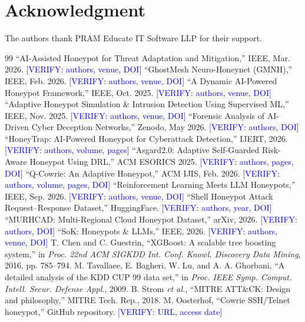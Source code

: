 \documentclass[conference]{IEEEtran}
\newcommand{\ver}[1]{\textcolor{blue}{[VERIFY: #1]}}
\begin{document}
\section*{Acknowledgment}
The authors thank PRAM Educate IT Software LLP for their support.

\begin{thebibliography}{99}
 ``AI-Assisted Honeypot for Threat Adaptation and Mitigation,'' IEEE, Mar. 2026. \ver{authors, venue, DOI}
 ``GhostMesh Neuro-Honeynet (GMNH),'' IEEE, Feb. 2026. \ver{authors, venue, DOI}
 ``A Dynamic AI-Powered Honeypot Framework,'' IEEE, Oct. 2025. \ver{authors, venue, DOI}
 ``Adaptive Honeypot Simulation \& Intrusion Detection Using Supervised ML,'' IEEE, Nov. 2025. \ver{authors, venue, DOI}
 ``Forensic Analysis of AI-Driven Cyber Deception Networks,'' Zenodo, May 2026. \ver{authors, DOI}
 ``HoneyTrap: AI-Powered Honeypot for Cyberattack Detection,'' IJERT, 2026. \ver{authors, volume, pages}
 ``Asgard2.0: Adaptive Self-Guarded Risk-Aware Honeypot Using DRL,'' ACM ESORICS 2025. \ver{authors, pages, DOI}
 ``Q-Cowrie: An Adaptive Honeypot,'' ACM IJIS, Feb. 2026. \ver{authors, volume, pages, DOI}
 ``Reinforcement Learning Meets LLM Honeypots,'' IEEE, Sep. 2026. \ver{authors, venue, DOI}
 ``Shell Honeypot Attack Request--Response Dataset,'' HuggingFace. \ver{authors, year, DOI}
 ``MURHCAD: Multi-Regional Cloud Honeypot Dataset,'' arXiv, 2026. \ver{authors, DOI}
 ``SoK: Honeypots \& LLMs,'' IEEE, 2026. \ver{authors, venue, DOI}
 T. Chen and C. Guestrin, ``XGBoost: A scalable tree boosting system,'' in \emph{Proc. 22nd ACM SIGKDD Int. Conf. Knowl. Discovery Data Mining}, 2016, pp. 785--794.
 M. Tavallaee, E. Bagheri, W. Lu, and A. A. Ghorbani, ``A detailed analysis of the KDD CUP 99 data set,'' in \emph{Proc. IEEE Symp. Comput. Intell. Secur. Defense Appl.}, 2009.
 B. Strom \emph{et al.}, ``MITRE ATT\&CK: Design and philosophy,'' MITRE Tech. Rep., 2018.
 M. Oosterhof, ``Cowrie SSH/Telnet honeypot,'' GitHub repository. \ver{URL, access date}
\end{thebibliography}

\balance
\end{document}
